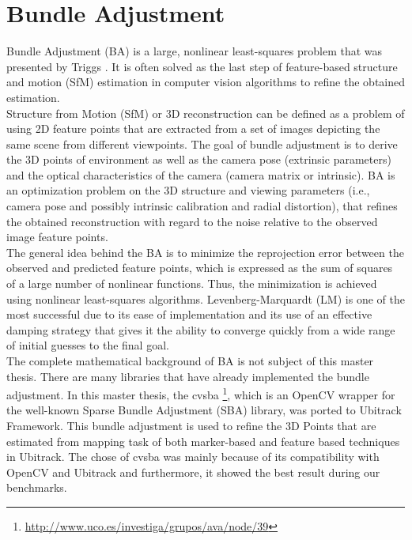 \chapter{Bundle Adjustment}\label{chapter:Bundle Adjustment}
Bundle Adjustment (BA) is a large, nonlinear least-squares problem that was presented by Triggs \cite{triggs2000bundle}. It is often solved as the last step of feature-based structure and motion (SfM) estimation in computer vision algorithms to refine the obtained estimation.\\
Structure from Motion (SfM) or 3D reconstruction can be defined as a problem of using 2D feature points that are extracted from a set of images depicting the same scene from different viewpoints. The goal of bundle adjustment is to derive the 3D points of environment as well as the camera pose (extrinsic parameters) and the optical characteristics of the camera (camera matrix or intrinsic). BA is an optimization problem on the 3D structure and viewing parameters (i.e., camera pose and possibly intrinsic calibration and radial distortion), that refines the obtained reconstruction with regard to the noise relative to the observed image feature points.\\
The general idea behind the BA is to minimize the reprojection error between the observed and predicted feature points, which is expressed as the sum of squares of a large number of nonlinear functions. Thus, the minimization is achieved using nonlinear least-squares algorithms. Levenberg-Marquardt (LM) is one of the most successful due to its ease of implementation and its use of an effective damping strategy that gives it the ability to converge quickly from a wide range of initial guesses to the final goal.\\
The complete mathematical background of BA is not subject of this master thesis. There are many libraries that have already implemented the bundle adjustment. In this master thesis, the cvsba \footnote{\url{http://www.uco.es/investiga/grupos/ava/node/39}}, which is an OpenCV wrapper for the well-known Sparse Bundle Adjustment (SBA) library, was ported to Ubitrack Framework. This bundle adjustment is used to refine the 3D Points that are estimated from mapping task of both marker-based and feature based techniques in Ubitrack. The chose of cvsba was mainly because of its compatibility with OpenCV and Ubitrack and furthermore, it showed the best result during our benchmarks.

